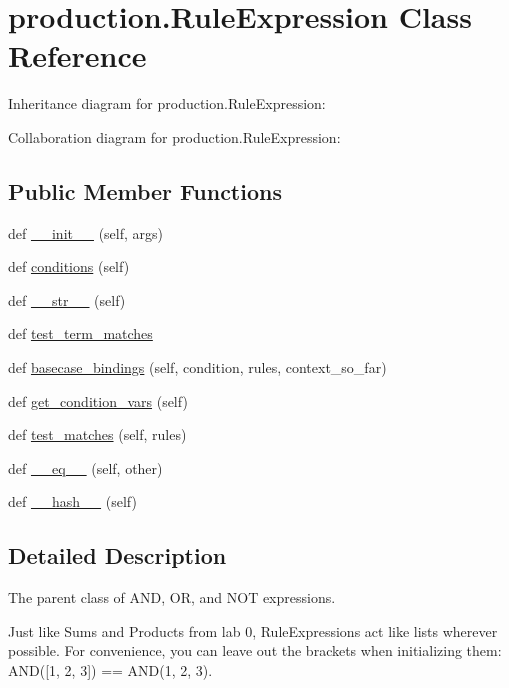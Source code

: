 \hypertarget{classproduction_1_1_rule_expression}{}\section{production.\+Rule\+Expression Class Reference}
\label{classproduction_1_1_rule_expression}


Inheritance diagram for production.\+Rule\+Expression\+:


Collaboration diagram for production.\+Rule\+Expression\+:
\subsection*{Public Member Functions}
\begin{DoxyCompactItemize}
\item 
def \hyperlink{classproduction_1_1_rule_expression_ab6d7a849ec3298b8b4a222e0208201b2}{\+\_\+\+\_\+init\+\_\+\+\_\+} (self, args)
\item 
def \hyperlink{classproduction_1_1_rule_expression_a0f5feebb30e016d12373b05723e001b1}{conditions} (self)
\item 
def \hyperlink{classproduction_1_1_rule_expression_a51c09052da5da96990ef0525c64f28f2}{\+\_\+\+\_\+str\+\_\+\+\_\+} (self)
\item 
def \hyperlink{classproduction_1_1_rule_expression_ab01f1ddf2fbacabf107473975d749e1a}{test\+\_\+term\+\_\+matches}
\item 
def \hyperlink{classproduction_1_1_rule_expression_ad530f5927cc21f08597c57845b417c58}{basecase\+\_\+bindings} (self, condition, rules, context\+\_\+so\+\_\+far)
\item 
def \hyperlink{classproduction_1_1_rule_expression_a01eda3165e4879358c77c101948d1773}{get\+\_\+condition\+\_\+vars} (self)
\item 
def \hyperlink{classproduction_1_1_rule_expression_a021d20def341cc41414d9bb6a20cf66a}{test\+\_\+matches} (self, rules)
\item 
def \hyperlink{classproduction_1_1_rule_expression_ad422592d44cf8b4fe1f987fe18f67896}{\+\_\+\+\_\+eq\+\_\+\+\_\+} (self, other)
\item 
def \hyperlink{classproduction_1_1_rule_expression_ae278b8ba8b2302409db2bb0e10a7f5e0}{\+\_\+\+\_\+hash\+\_\+\+\_\+} (self)
\end{DoxyCompactItemize}


\subsection{Detailed Description}
\begin{DoxyVerb}The parent class of AND, OR, and NOT expressions.

Just like Sums and Products from lab 0, RuleExpressions act
like lists wherever possible. For convenience, you can leave
out the brackets when initializing them: AND([1, 2, 3]) ==
AND(1, 2, 3).
\end{DoxyVerb}
 

